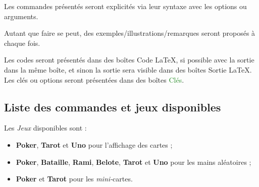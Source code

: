 \documentclass[a4paper]{article}
\newcommand\Cle[1]{{\bfseries\sffamily\textlangle #1\textrangle}}
\begin{document}
{{{{{{{{{{{\begin{codeinfo}
Les \textsf{commandes} présentés seront explicités via leur \textsf{syntaxe} avec les \textsf{options} ou \textsf{arguments}.

Autant que faire se peut, des exemples/illustrations/remarques seront proposés à chaque fois.

\smallskip

Les \textsf{codes} seront présentés dans des \textsf{boîtes} \textcolor{red!75!black}{{\small \faCode} Code \LaTeX}, si possible avec la \textsf{sortie} dans la même boîte, et sinon la \textsf{sortie} sera visible dans des \textsf{boîtes} \textcolor{red!75!black}{{\small \faArrowAltCircleRight[regular]} Sortie \LaTeX}. Les \textsf{clés} ou \textsf{options} seront présentées dans des \textsf{boîtes} \textcolor{ForestGreen}{{\small \faPaperclip} Clés}.
\end{codeinfo}

\subsection{Liste des commandes et jeux disponibles}

\begin{codeinfo}
Les \textit{Jeux} disponibles sont :

\begin{itemize}
	\item \Cle{Poker}, \Cle{Tarot} et \Cle{Uno} pour l'affichage des cartes ;
	\item \Cle{Poker}, \Cle{Bataille}, \Cle{Rami}, \Cle{Belote}, \Cle{Tarot}  et \Cle{Uno} pour les mains aléatoires ;
	\item \Cle{Poker} et \Cle{Tarot} pour les \textit{mini-}cartes.
\end{itemize}
\end{codeinfo}

\begin{codetex}






\end{codetex}}}}}}}}}}}}
\end{document}

